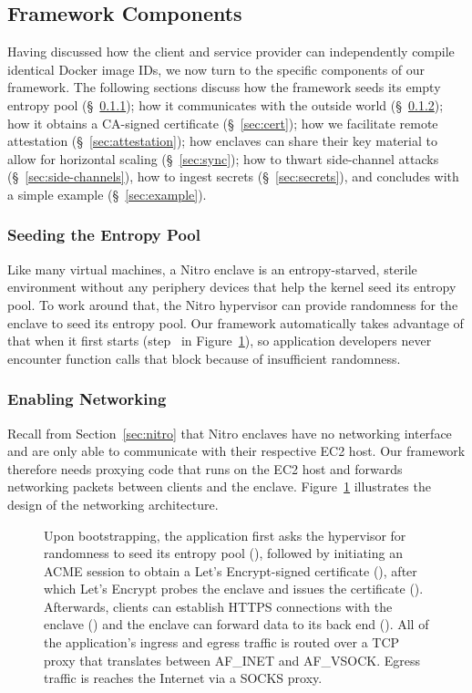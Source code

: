 \subsection{Framework Components}
\label{sec:framework}

Having discussed how the client and service provider can independently compile
identical Docker image IDs, we now turn to the specific components of our
framework.  The following sections discuss how the framework
seeds its empty entropy pool (\S~\ref{sec:entropy});
how it communicates with the outside world (\S~\ref{sec:networking});
how it obtains a CA-signed certificate (\S~\ref{sec:cert});
how we facilitate remote attestation (\S~\ref{sec:attestation});
how enclaves can share their key material to allow for horizontal scaling (\S~\ref{sec:sync});
how to thwart side-channel attacks (\S~\ref{sec:side-channels}),
how to ingest secrets (\S~\ref{sec:secrets}), and
concludes with a simple example (\S~\ref{sec:example}).

\subsubsection{Seeding the Entropy Pool}
\label{sec:entropy}

Like many virtual machines, a Nitro enclave is an entropy-starved, sterile
environment without any periphery devices that help the kernel seed its entropy
pool.  To work around that, the Nitro hypervisor can provide randomness for the
enclave to seed its entropy pool.  Our framework automatically takes advantage
of that when it first starts (step~ in Figure~\ref{fig:networking}),
so application developers never encounter function calls that block because of
insufficient randomness.

\subsubsection{Enabling Networking}
\label{sec:networking}

Recall from Section~\ref{sec:nitro} that Nitro enclaves have no networking
interface and are only able to communicate with their respective EC2 host.  Our
framework therefore needs proxying code that runs on the EC2 host and forwards
networking packets between clients and the enclave.  Figure~\ref{fig:networking}
illustrates the design of the networking architecture.

\begin{figure}[t]
\centering

\caption{Upon bootstrapping, the application first asks the hypervisor for
  randomness to seed its entropy pool (), followed by initiating an
  ACME session to obtain a Let's Encrypt-signed certificate (), after
  which Let's Encrypt probes the enclave and issues the certificate
  ().  Afterwards, clients can establish HTTPS connections with the
  enclave () and the enclave can forward data to its back end
  ().  All of the application's ingress and egress  traffic is routed
  over a TCP proxy that translates between AF\_INET and AF\_VSOCK.  Egress
  traffic is reaches the Internet via a SOCKS proxy.}
\label{fig:networking}
\end{figure}

